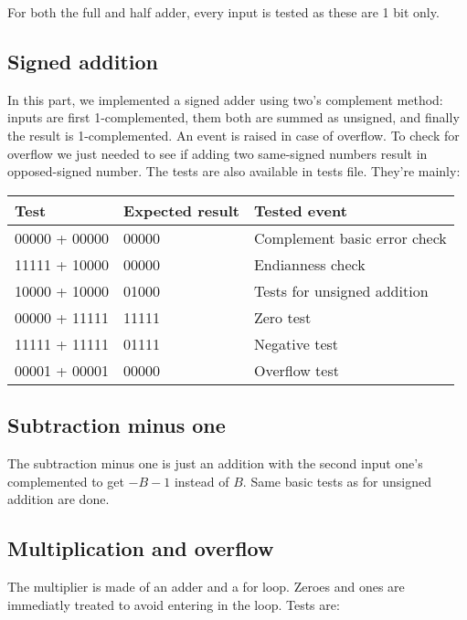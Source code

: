 \documentclass[a4paper]{report}
\begin{document}
	For both the full and half adder, every input is tested as these are 1 bit only. \\

\subsection{Signed addition}

	In this part, we implemented a signed adder using two's complement method: inputs are first 1-complemented, them both are summed as unsigned, and finally the result is 1-complemented. An event is raised in case of overflow. To check for overflow we just needed to see if adding two same-signed numbers result in opposed-signed number. The tests are also available in tests file. They're mainly:

\begin{center}
	\begin{tabular}{|l|l|l|}
		\hline
		Test & Expected result & Tested event \\
		\hline \hline
		00000 + 00000 & 00000 & Complement basic error check \\
		11111 + 10000 & 00000 & Endianness check \\
		10000 + 10000 & 01000 & Tests for unsigned addition \\
		00000 + 11111 & 11111 & Zero test \\
		11111 + 11111 & 01111 & Negative test \\
		00001 + 00001 & 00000 & Overflow test \\
		\hline
	\end{tabular}
\end{center}

\subsection{Subtraction minus one}

	The subtraction minus one is just an addition with the second input one's complemented to get $-B-1$ instead of $B$. Same basic tests as for unsigned addition are done.

\subsection{Multiplication and overflow}

	The multiplier is made of an adder and a for loop. Zeroes and ones are immediatly treated to avoid entering in the loop. Tests are:
\end{document}
